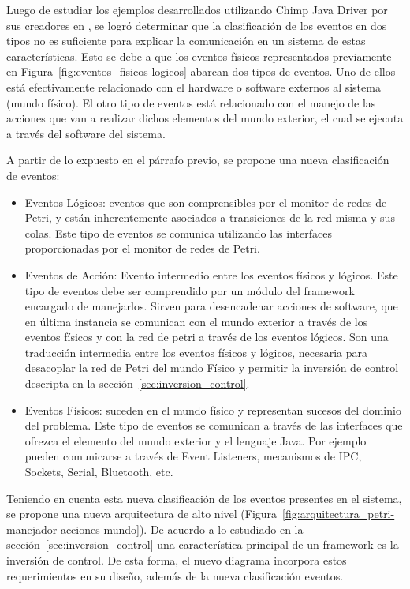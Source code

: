 Luego de estudiar los ejemplos desarrollados utilizando Chimp Java Driver por
sus creadores en \cite{chimp}, se logró determinar que la clasificación de los
eventos en dos tipos no es suficiente para explicar la comunicación en un
sistema de estas características. Esto se debe a que los eventos físicos
representados previamente en Figura~\ref{fig:eventos_fisicos-logicos} abarcan dos
tipos de eventos. Uno de ellos está efectivamente relacionado con el hardware o
software externos al sistema (mundo físico). El otro tipo de eventos está
relacionado con el manejo de las acciones que van a realizar dichos elementos
del mundo exterior, el cual se ejecuta a través del software del sistema.

A partir de lo expuesto en el párrafo previo, se propone una nueva clasificación
de eventos:

\begin{itemize}
    \item Eventos Lógicos: eventos que son comprensibles por el monitor de
    redes de Petri, y están inherentemente asociados a transiciones de la red
    misma y sus colas. Este tipo de eventos se comunica utilizando las
    interfaces proporcionadas por el monitor de redes de Petri.
    \item Eventos de Acción: Evento intermedio
    entre los eventos físicos y lógicos. Este tipo de eventos debe ser
    comprendido por un módulo del framework encargado de manejarlos. Sirven para
    desencadenar acciones de software, que en última instancia se comunican con
    el mundo exterior a través de los eventos físicos y con la red de petri a
    través de los eventos lógicos. Son una traducción intermedia entre los
    eventos físicos y lógicos, necesaria para desacoplar la red de Petri del
    mundo Físico y permitir la inversión de control descripta en la
    sección~\ref{sec:inversion_control}.
    \item Eventos Físicos: suceden en el mundo físico y representan sucesos del
    dominio del problema. Este tipo de eventos se comunican a través de las
    interfaces que ofrezca el elemento del mundo exterior y el lenguaje Java.
    Por ejemplo pueden comunicarse a través de Event Listeners, mecanismos
    de IPC, Sockets, Serial, Bluetooth, etc.
\end{itemize}

Teniendo en cuenta esta nueva clasificación de los eventos presentes en el
sistema, se propone una nueva arquitectura de alto nivel
(Figura~\ref{fig:arquitectura_petri-manejador-acciones-mundo}). De acuerdo a
lo estudiado en la sección~\ref{sec:inversion_control} una característica
principal de un framework es la inversión de control.
De esta forma, el nuevo diagrama incorpora estos requerimientos en su diseño,
además de la nueva clasificación eventos.

